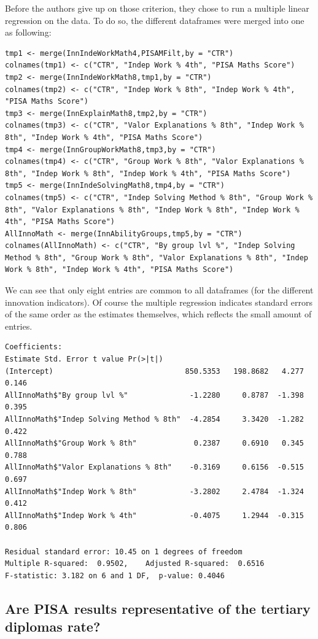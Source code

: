\documentclass[12pt,a4paper]{article}
\begin{document}
Before the authors give up on those criterion, they chose to run a multiple linear regression on the data. To do so, the different dataframes were merged into one as following:
\begin{lstlisting}
tmp1 <- merge(InnIndeWorkMath4,PISAMFilt,by = "CTR")			
colnames(tmp1) <- c("CTR", "Indep Work % 4th", "PISA Maths Score")
tmp2 <- merge(InnIndeWorkMath8,tmp1,by = "CTR")			
colnames(tmp2) <- c("CTR", "Indep Work % 8th", "Indep Work % 4th", "PISA Maths Score")
tmp3 <- merge(InnExplainMath8,tmp2,by = "CTR")				
colnames(tmp3) <- c("CTR", "Valor Explanations % 8th", "Indep Work % 8th", "Indep Work % 4th", "PISA Maths Score")
tmp4 <- merge(InnGroupWorkMath8,tmp3,by = "CTR")			
colnames(tmp4) <- c("CTR", "Group Work % 8th", "Valor Explanations % 8th", "Indep Work % 8th", "Indep Work % 4th", "PISA Maths Score")
tmp5 <- merge(InnIndeSolvingMath8,tmp4,by = "CTR")		
colnames(tmp5) <- c("CTR", "Indep Solving Method % 8th", "Group Work % 8th", "Valor Explanations % 8th", "Indep Work % 8th", "Indep Work % 4th", "PISA Maths Score")
AllInnoMath <- merge(InnAbilityGroups,tmp5,by = "CTR")			
colnames(AllInnoMath) <- c("CTR", "By group lvl %", "Indep Solving Method % 8th", "Group Work % 8th", "Valor Explanations % 8th", "Indep Work % 8th", "Indep Work % 4th", "PISA Maths Score")
\end{lstlisting}
We can see that only eight entries are common to all dataframes (for the different innovation indicators).
Of course the multiple regression indicates standard errors of the same order as the estimates themselves, which reflects the small amount of entries.
\begin{lstlisting}
Coefficients:
Estimate Std. Error t value Pr(>|t|)
(Intercept)                              850.5353   198.8682   4.277    0.146
AllInnoMath$"By group lvl %"              -1.2280     0.8787  -1.398    0.395
AllInnoMath$"Indep Solving Method % 8th"  -4.2854     3.3420  -1.282    0.422
AllInnoMath$"Group Work % 8th"             0.2387     0.6910   0.345    0.788
AllInnoMath$"Valor Explanations % 8th"    -0.3169     0.6156  -0.515    0.697
AllInnoMath$"Indep Work % 8th"            -3.2802     2.4784  -1.324    0.412
AllInnoMath$"Indep Work % 4th"            -0.4075     1.2944  -0.315    0.806

Residual standard error: 10.45 on 1 degrees of freedom
Multiple R-squared:  0.9502,    Adjusted R-squared:  0.6516 
F-statistic: 3.182 on 6 and 1 DF,  p-value: 0.4046
\end{lstlisting}

\subsection{Are PISA results representative of the tertiary diplomas rate? }
\end{document}
